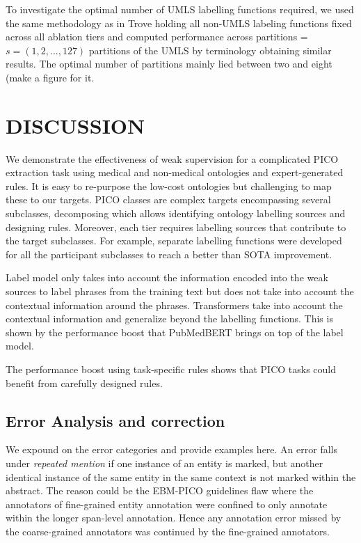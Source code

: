 \documentclass[10.7pt,]{article}
\begin{document}
To investigate the optimal number of UMLS labelling functions required, we used the same methodology as in Trove holding all non-UMLS labeling functions fixed across all ablation tiers and computed performance across partitions = $s = ( 1, 2, \dotso , 127 )$ partitions of the UMLS by terminology obtaining similar results.
The optimal number of partitions mainly lied between two and eight (make a figure for it.
%
%
%
\section{DISCUSSION}\label{discussion}
%
We demonstrate the effectiveness of weak supervision for a complicated PICO extraction task using medical and non-medical ontologies and expert-generated rules.
It is easy to re-purpose the low-cost ontologies but challenging to map these to our targets.
PICO classes are complex targets encompassing several subclasses, decomposing which allows identifying ontology labelling sources and designing rules. 
Moreover, each tier requires labelling sources that contribute to the target subclasses.
For example, separate labelling functions were developed for all the participant subclasses to reach a better than SOTA improvement.


Label model only takes into account the information encoded into the weak sources to label phrases from the training text but does not take into account the contextual information around the phrases.
Transformers take into account the contextual information and generalize beyond the labelling functions.
This is shown by the performance boost that PubMedBERT brings on top of the label model.

The performance boost using task-specific rules shows that PICO tasks could benefit from carefully designed rules.
%
%
%
\subsection{Error Analysis and correction}\label{err_ana}
%
We expound on the error categories and provide examples here.
An error falls under \textit{repeated mention} if one instance of an entity is marked, but another identical instance of the same entity in the same context is not marked within the abstract. 
The reason could be the EBM-PICO guidelines flaw where the annotators of fine-grained entity annotation were confined to only annotate within the longer span-level annotation.
Hence any annotation error missed by the coarse-grained annotators was continued by the fine-grained annotators.
\end{document}
